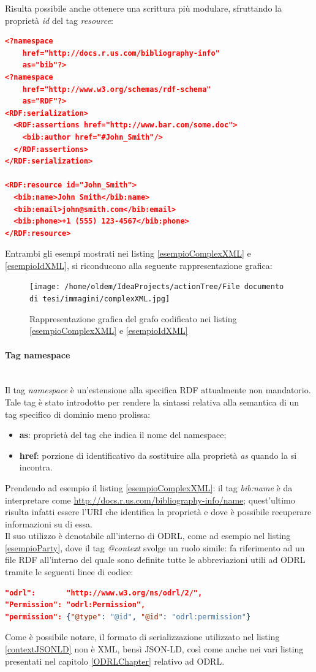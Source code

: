 \documentclass[12pt,a4paper,twoside]{book}
\begin{document}
Risulta possibile anche ottenere una scrittura più modulare, sfruttando la proprietà \textit{id} del tag \textit{resource}:
\begin{lstlisting}[language=json,firstnumber=1,caption={Esempio di metadato conforme ad RDF in XML},captionpos=b,label=esempioIdXML]
<?namespace 
	href="http://docs.r.us.com/bibliography-info" 
	as="bib"?> 
<?namespace 
	href="http://www.w3.org/schemas/rdf-schema"
	as="RDF"?> 
<RDF:serialization> 
  <RDF:assertions href="http://www.bar.com/some.doc"> 
    <bib:author href="#John_Smith"/> 
  </RDF:assertions> 
</RDF:serialization>

<RDF:resource id="John_Smith"> 
  <bib:name>John Smith</bib:name> 
  <bib:email>john@smith.com</bib:email> 
  <bib:phone>+1 (555) 123-4567</bib:phone> 
</RDF:resource> 
\end{lstlisting}
Entrambi gli esempi mostrati nei listing \ref{esempioComplexXML} e \ref{esempioIdXML}, si riconducono alla seguente rappresentazione grafica:
\begin{figure}[H]
\centering
\texttt{[image: /home/oldem/IdeaProjects/actionTree/File documento di tesi/immagini/complexXML.jpg]}
\caption{Rappresentazione grafica del grafo codificato nei listing \ref{esempioComplexXML} e \ref{esempioIdXML}}
\label{imgEsempioComplexXML}
\end{figure}
\paragraph{Tag namespace}\mbox{}\\
Il tag \textit{namespace} è un'estensione alla specifica RDF attualmente non mandatorio. Tale tag è stato introdotto per rendere la sintassi relativa alla semantica di un tag specifico di dominio meno prolissa:
\begin{itemize}
 \item \textbf{as}: proprietà del tag che indica il nome del namespace;
 \item \textbf{href}: porzione di identificativo da sostituire alla proprietà \textit{as} quando la si incontra.
\end{itemize} 
Prendendo ad esempio il listing \ref{esempioComplexXML}: il tag \textit{bib:name} è da interpretare come \url{http://docs.r.us.com/bibliography-info/name}; quest'ultimo risulta infatti essere l'URI che identifica la proprietà e dove è possibile recuperare informazioni su di essa.\\
Il suo utilizzo è denotabile all'interno di ODRL, come ad esempio nel listing \ref{esempioParty}, dove il tag \textit{@context} svolge un ruolo simile: fa riferimento ad un file RDF all'interno del quale sono definite tutte le abbreviazioni utili ad ODRL tramite le seguenti linee di codice:
\begin{lstlisting}[language=json,firstnumber=1,caption={Estratto context ODRL\cite{ODRLContext}},captionpos=b,label=contextJSONLD]
"odrl":       "http://www.w3.org/ns/odrl/2/",
"Permission": "odrl:Permission",
"permission": {"@type": "@id", "@id": "odrl:permission"}
\end{lstlisting}
Come è possibile notare, il formato di serializzazione utilizzato nel listing \ref{contextJSONLD} non è XML, bensì JSON-LD, così come anche nei vari listing presentati nel capitolo \ref{ODRLChapter} relativo ad ODRL.
\end{document}
